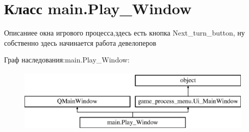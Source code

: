 \hypertarget{classmain_1_1_play___window}{}\section{Класс main.\+Play\+\_\+\+Window}
\label{classmain_1_1_play___window}


Описаниее окна игрового процесса,здесь есть кнопка Next\+\_\+turn\+\_\+button, ну собственно здесь начинается работа девелоперов  


Граф наследования\+:main.\+Play\+\_\+\+Window\+:\begin{figure}[H]
\begin{center}
\leavevmode
\includegraphics[height=3.000000cm]{classmain_1_1_play___window}
\end{center}
\end{figure}
